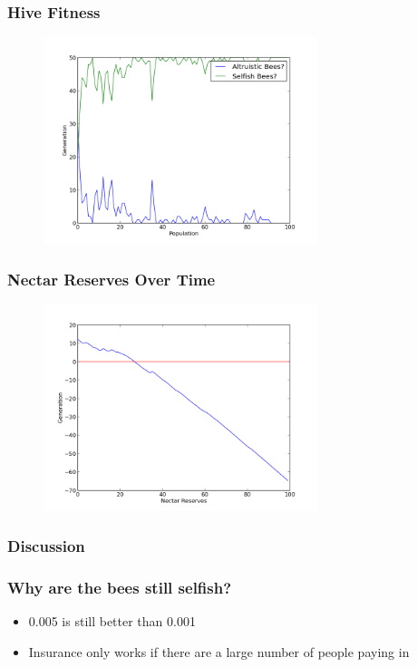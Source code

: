 \documentclass{beamer}
\begin{document}
        \begin{frame}[t]\frametitle{Hive Fitness}
          \begin{figure}
          \includegraphics[width=8cm]{results/hive_influenced_bees.png}
          \end{figure}
        \end{frame}

        \begin{frame}[t]\frametitle{Nectar Reserves Over Time}
          \begin{figure}
          \includegraphics[width=8cm]{results/hive_influenced_bees_nectar.png}
          \end{figure}
        \end{frame}




      \subsubsection{Discussion} %
      \label{ssub:discussion}

        \begin{frame}[c]\frametitle{Why are the bees still selfish?}

          \begin{itemize}
            \item 0.005 is still better than 0.001
            \item Insurance only works if there are a large number of people
                  paying in
          \end{itemize}
        
        \end{frame}
\end{document}
